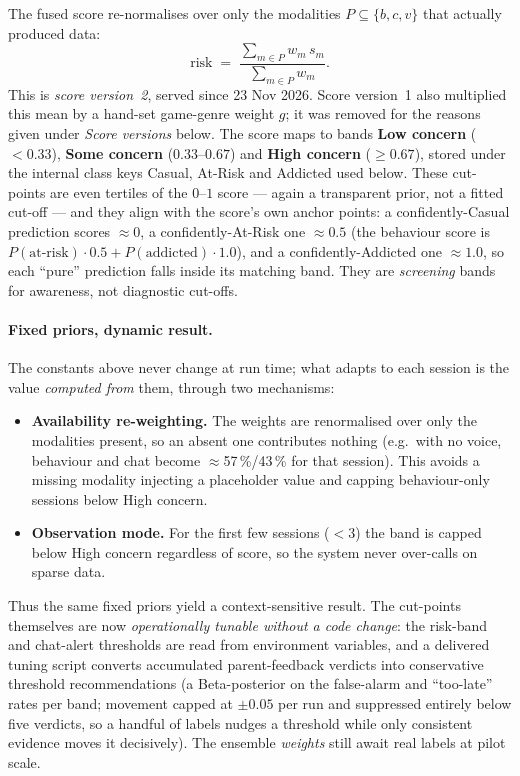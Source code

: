 \documentclass[11pt,a4paper]{article}
\begin{document}
The fused score re-normalises over only the modalities $P\subseteq\{b,c,v\}$ that
actually produced data:
\[
\text{risk} \;=\; \frac{\sum_{m\in P} w_m\, s_m}{\sum_{m\in P} w_m}.
\]
This is \emph{score version~2}, served since 23 Nov 2026. Score version~1 also
multiplied this mean by a hand-set game-genre weight $g$; it was removed for the
reasons given under \emph{Score versions} below.
The score maps to bands \textbf{Low concern} ($<0.33$), \textbf{Some concern}
($0.33$--$0.67$) and \textbf{High concern} ($\geq 0.67$), stored under the internal class
keys Casual, At-Risk and Addicted used below. These cut-points are even tertiles of the $0$--$1$ score
--- again a transparent prior, not a fitted cut-off --- and they align with the score's
own anchor points: a confidently-Casual prediction scores $\approx 0$, a
confidently-At-Risk one $\approx 0.5$ (the behaviour score is $P(\text{at-risk})\cdot 0.5
+ P(\text{addicted})\cdot 1.0$), and a confidently-Addicted one $\approx 1.0$, so each
``pure'' prediction falls inside its matching band. They are \emph{screening} bands for
awareness, not diagnostic cut-offs.

\paragraph{Fixed priors, dynamic result.}
The constants above never change at run time; what adapts to each session is the value
\emph{computed from} them, through two mechanisms:
\begin{itemize}[leftmargin=1.4em]
  \item \textbf{Availability re-weighting.} The weights are renormalised over only the
        modalities present, so an absent one contributes nothing (e.g.\ with no voice,
        behaviour and chat become $\approx$57\,\%/43\,\% for that session). This avoids a
        missing modality injecting a placeholder value and capping behaviour-only
        sessions below High concern.
  \item \textbf{Observation mode.} For the first few sessions ($<3$) the band is capped
        below High concern regardless of score, so the system never over-calls on sparse
        data.
\end{itemize}
Thus the same fixed priors yield a context-sensitive result. The cut-points themselves
are now \emph{operationally tunable without a code change}: the risk-band and
chat-alert thresholds are read from environment variables, and a delivered tuning
script converts accumulated parent-feedback verdicts into conservative threshold
recommendations (a Beta-posterior on the false-alarm and ``too-late'' rates per band;
movement capped at $\pm 0.05$ per run and suppressed entirely below five verdicts, so a
handful of labels nudges a threshold while only consistent evidence moves it
decisively). The ensemble \emph{weights} still await real labels at pilot scale.
\end{document}
